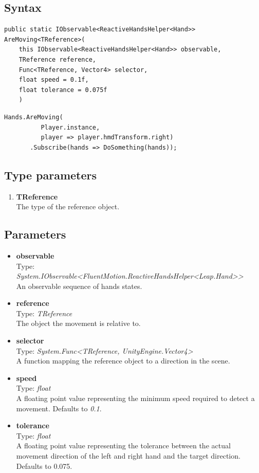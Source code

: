 \documentclass[12pt,a4paper,twoside]{report}
\begin{document}
\subsection{Syntax}
\begin{lstlisting}[caption=Declaration]
  public static IObservable<ReactiveHandsHelper<Hand>> AreMoving<TReference>(
    this IObservable<ReactiveHandsHelper<Hand>> observable,
    TReference reference,
    Func<TReference, Vector4> selector,
    float speed = 0.1f,
    float tolerance = 0.075f
    )
\end{lstlisting}

\begin{lstlisting}[caption=Usage example]
  Hands.AreMoving(
          Player.instance,
          player => player.hmdTransform.right)
       .Subscribe(hands => DoSomething(hands));
\end{lstlisting}

\subsection{Type parameters}
\begin{enumerate}
  \item \textbf{TReference}\\
    The type of the reference object.
\end{enumerate}

\subsection{Parameters}
\begin{itemize}
  \item \textbf{observable}\\
    Type: \textit{System.IObservable<FluentMotion.ReactiveHandsHelper<Leap.Hand>{}>}\\
    An observable sequence of hands states.

  \item \textbf{reference}\\
    Type: \textit{TReference}\\
    The object the movement is relative to.
  \item \textbf{selector}\\
    Type: \textit{System.Func<TReference, UnityEngine.Vector4>}\\
    A function mapping the reference object to a direction in the scene.
  \item \textbf{speed}\\
    Type: \textit{float}\\
    A floating point value representing the minimum speed required to detect a movement. Defaults to \textit{0.1}.
  \item \textbf{tolerance}\\
    Type: \textit{float} \\
    A floating point value representing the tolerance between the actual movement direction of the left and right hand and the target direction.  Defaults to 0.075.
\end{itemize}
\end{document}
